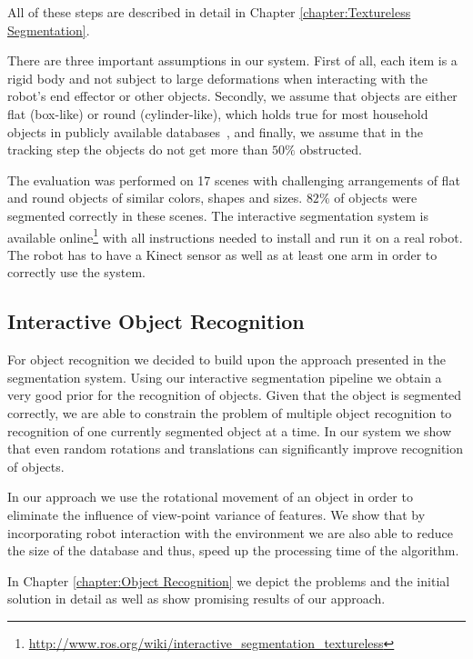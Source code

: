 All of these steps are described in detail in Chapter \ref{chapter:Textureless Segmentation}. 


There are three important assumptions in our system. First of all, each item is a rigid  body and not subject
to large deformations when  interacting with  the robot's  end  effector or
other objects. Secondly, we assume that objects are either flat (box-like) or round (cylinder-like),
which holds true for most household objects in publicly available databases~\cite{marton11ijrr}, and finally, we assume
that in the tracking step the objects do not get more than $50\%$ obstructed.

The evaluation was performed on 17 scenes with challenging arrangements of flat and
round objects of similar colors, shapes and sizes. $82\%$ of objects
were segmented correctly in these scenes. The interactive segmentation system is available online\footnote{\url{http://www.ros.org/wiki/interactive_segmentation_textureless}} with all instructions needed to install and run it on a real robot. The robot has to have a Kinect sensor as well as at least one arm in order to correctly use the system.

\subsection{Interactive Object Recognition} 

For object recognition we decided to build upon the approach presented in the segmentation system. Using our interactive segmentation pipeline we obtain a very good prior for the recognition of objects. Given that the object is segmented correctly, we are able to constrain the problem of multiple object recognition to recognition of one currently segmented object at a time. In our system we show that even random rotations and translations can significantly improve recognition of objects.

In our approach we use the rotational movement of an object in order to eliminate the influence of view-point variance of features. We show that by incorporating robot interaction with the environment we are also able to reduce the size of the database and thus, speed up the processing time of the algorithm.

In Chapter \ref{chapter:Object Recognition} we depict the problems and the initial solution in detail as well as show promising results of our approach.
    















